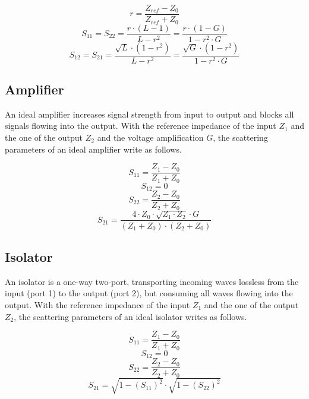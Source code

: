 \begin{equation}
r = \frac{Z_{ref}-Z_0}{Z_{ref}+Z_0}
\end{equation}
\begin{equation}
S_{11} = S_{22} = \frac{r\cdot(L-1)}{L-r^2} = \frac{r\cdot(1-G)}{1-r^2\cdot G}
\end{equation}
\begin{equation}
S_{12} = S_{21} = \frac{\sqrt{L}\cdot(1-r^2)}{L-r^2} = \frac{\sqrt{G}\cdot(1-r^2)}{1-r^2\cdot G}
\end{equation}

\subsection{Amplifier}

An ideal amplifier increases signal strength from input to output and
blocks all signals flowing into the output.  With the reference
impedance of the input $Z_1$ and the one of the output $Z_2$ and the
voltage amplification $G$, the scattering parameters of an ideal
amplifier write as follows.

\begin{equation}
S_{11} = \frac{Z_1-Z_0}{Z_1+Z_0}
\end{equation}
\begin{equation}
S_{12} = 0
\end{equation}
\begin{equation}
S_{22} = \frac{Z_2-Z_0}{Z_2+Z_0}
\end{equation}
\begin{equation}
S_{21} = \frac{4\cdot Z_0\cdot\sqrt{Z_1\cdot Z_2}\cdot G}{(Z_1+Z_0)\cdot(Z_2+Z_0)}
\end{equation}

\subsection{Isolator}

An isolator is a one-way two-port, transporting incoming waves
lossless from the input (port 1) to the output (port 2), but consuming
all waves flowing into the output. With the reference impedance of the
input $Z_1$ and the one of the output $Z_2$, the scattering parameters
of an ideal isolator writes as follows.

\begin{equation}
S_{11} = \frac{Z_1-Z_0}{Z_1+Z_0}
\end{equation}
\begin{equation}
S_{12} = 0
\end{equation}
\begin{equation}
S_{22} = \frac{Z_2-Z_0}{Z_2+Z_0}
\end{equation}
\begin{equation}
S_{21} = \sqrt{1-(S_{11})^2}\cdot\sqrt{1-(S_{22})^2}
\end{equation}

